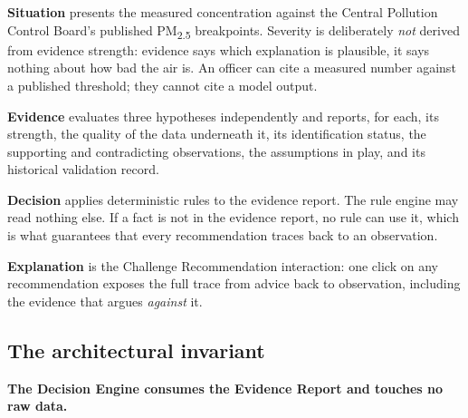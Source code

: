 \documentclass[11pt,a4paper]{article}
\newcommand{\keyclaim}[1]{%
  \par\vspace{0.7ex}\noindent
  \colorbox{vwash}{\parbox{\dimexpr\linewidth-2\fboxsep}{%
    \color{vblack}\textbf{#1}}}%
  \par\vspace{0.9ex}}
\newcommand{\PM}{PM\textsubscript{2.5}}
\begin{document}
\begin{center}
\end{center}

\textbf{Situation} presents the measured concentration against the Central
Pollution Control Board's published \PM{} breakpoints. Severity is deliberately
\emph{not} derived from evidence strength: evidence says which explanation is
plausible, it says nothing about how bad the air is. An officer can cite a measured
number against a published threshold; they cannot cite a model output.

\textbf{Evidence} evaluates three hypotheses independently and reports, for each,
its strength, the quality of the data underneath it, its identification status, the
supporting and contradicting observations, the assumptions in play, and its
historical validation record.

\textbf{Decision} applies deterministic rules to the evidence report. The rule
engine may read nothing else. If a fact is not in the evidence report, no rule can
use it, which is what guarantees that every recommendation traces back to an
observation.

\textbf{Explanation} is the Challenge Recommendation interaction: one click on any
recommendation exposes the full trace from advice back to observation, including
the evidence that argues \emph{against} it.

\subsection{The architectural invariant}

\keyclaim{The Decision Engine consumes the Evidence Report and touches no raw data.}
\end{document}
